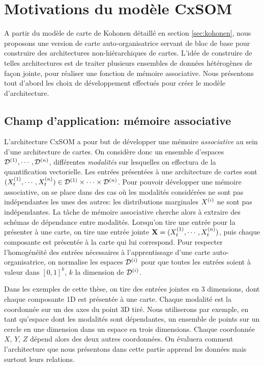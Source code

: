 \documentclass[../main]{subfiles}
\begin{document}
\section{Motivations du modèle CxSOM}
A partir du modèle de carte de Kohonen détaillé en section \ref{sec:kohonen}, nous proposons une version de carte auto-organisatrice servant de bloc de base pour construire des architectures non-hiérarchiques de cartes. L'idée de construire de telles architectures est de traiter plusieurs ensembles de données hétérogènes de façon jointe, pour réaliser une fonction de mémoire associative.
Nous présentons tout d'abord les choix de développement effectués pour créer le modèle d'architecture.

\subsection{Champ d'application: mémoire associative}
L'architecture CxSOM a pour but de développer une mémoire \emph{associative} au sein d'une architecture de cartes. On considère donc un ensemble d'espaces $\mathcal{D}^{({1})}, \cdots , \mathcal{D}^{({n})}$, différentes \emph{modalités} sur lesquelles on effectura de la quantification vectorielle. Les entrées présentées à une architecture de cartes sont $(X^{({1})}_t, \cdots, X^{({n})}_t) \in \mathcal{D}^{({1})} \times \cdots \times \mathcal{D}^{({n})}$. Pour pouvoir développer une mémoire associative, on se place dans des cas où les modalités considérées ne sont pas indépendantes les unes des autres: les distributions marginales $X^{({i})}$ ne sont pas indépendantes. La tâche de mémoire associative cherche alors à extraire des schémas de dépendance entre modalités. Lorsqu'on tire une entrée pour la présenter à une carte, on tire une entrée jointe $\mathbf{X} =  (X^{({1})}_t, \cdots , X^{({n})}_t)$, puis chaque composante est présentée à la carte qui lui correspond. Pour respecter l'homogénéité des entrées nécessaires à l'apprentissage d'une carte auto-organisatrice, on normalise les espaces $\mathcal{D}^{({i})}$ pour que toutes les entrées soient à valeur dans $[0,1]^k$, $k$ la dimension de $\mathcal{D}^{({i})}$.

Dans les exemples de cette thèse, on tire des entrées jointes en 3 dimensions, dont chaque composante 1D est présentée à une carte. Chaque modalité est la coordonnée sur un des axes du point 3D tiré. Nous utiliserons par exemple, en tant qu'espace dont les modalités sont dépendantes, un ensemble de points sur un cercle en une dimension dans un espace en trois dimensions. Chaque coordonnée $X$, $Y$, $Z$ dépend alors des deux autres coordonnées. On évaluera comment l'architecture que nous présentons dans cette partie apprend les données mais surtout leurs relations. 
\end{document}
